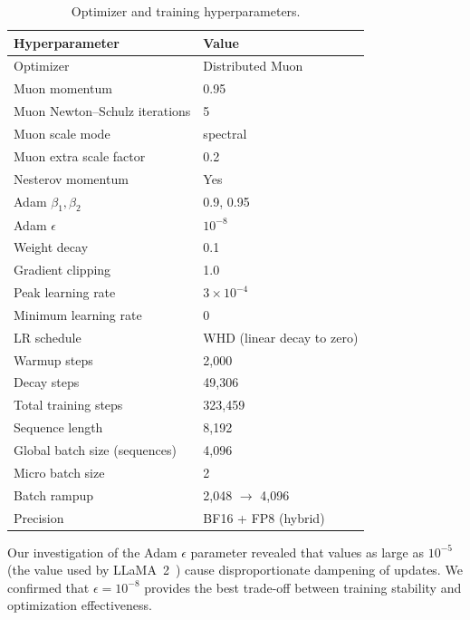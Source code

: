 \documentclass{llmxive}
\providecommand{\tableheadercolor}{}
\begin{document}
\begin{table}[!htbp]
  \centering
  \small
  \begin{tabular}{@{}ll@{}}
    \toprule
    \tableheadercolor
    \textbf{Hyperparameter} & \textbf{Value} \\
    \midrule
    Optimizer                      & Distributed Muon \\
    Muon momentum                  & 0.95 \\
    Muon Newton--Schulz iterations & 5 \\
    Muon scale mode                & spectral \\
    Muon extra scale factor        & 0.2 \\
    Nesterov momentum              & Yes \\
    Adam $\beta_1, \beta_2$        & 0.9, 0.95 \\
    Adam $\epsilon$                & $10^{-8}$ \\
    Weight decay                   & 0.1 \\
    Gradient clipping              & 1.0 \\
    Peak learning rate             & $3 \times 10^{-4}$ \\
    Minimum learning rate          & 0 \\
    LR schedule                    & WHD (linear decay to zero) \\
    Warmup steps                   & 2{,}000 \\
    Decay steps                    & 49{,}306 \\
    Total training steps           & 323{,}459 \\
    Sequence length                & 8{,}192 \\
    Global batch size (sequences)  & 4{,}096 \\
    Micro batch size               & 2 \\
    Batch rampup                   & 2{,}048 $\to$ 4{,}096 \\
    Precision                      & BF16 + FP8 (hybrid) \\
    \bottomrule
  \end{tabular}
\caption{Optimizer and training hyperparameters.}
\label{tab:hyperparams}
\end{table}

Our investigation of the Adam $\epsilon$ parameter revealed that values as large as
$10^{-5}$ (the value used by LLaMA~2~\cite{touvron2023llama2}) cause disproportionate dampening of
updates. We confirmed that $\epsilon = 10^{-8}$ provides the best trade-off between
training stability and optimization effectiveness.
\end{document}
